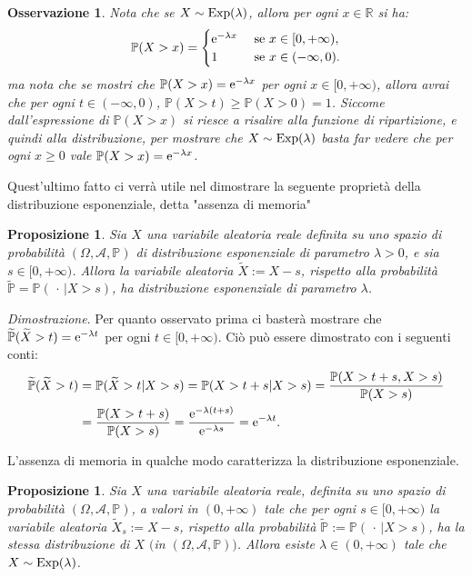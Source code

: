 \documentclass[11pt]{book}
\makeatletter
\theoremstyle{Definizione}
\theoremstyle{TeoremaProposizioneLemmaCorollario}
\newtheorem{mypropo}[myteo]{Proposizione}
\theoremstyle{OsservazioneNota}
\newtheorem{myobs}{Osservazione}[section]
\renewenvironment{proof}[1][\proofname]{\par
  \normalfont \topsep6\p@\@plus6\p@\relax
  \trivlist
  \item[\hskip\labelsep
        \itshape
    #1\@addpunct{.}]\ignorespaces
}{%
  \endtrivlist\@endpefalse
}
\newcommand{\R}{\mathbb{R}}
\renewcommand{\P}{\mathbb{P}}
\newcommand{\e}{\textup{e}}
\renewenvironment{proof}{\textsl{Dimostrazione}.}{}
\makeatother
\begin{document}
\begin{myobs}
Nota che se $X \sim \textup{Exp}(\lambda)$, allora per ogni $x\in \R$ si ha:
$$
\P(X > x) = \begin{cases}
\e^{-\lambda x} &\textup{ se }x\in [0,+\infty),\\
1 & \textup{ se }x \in (-\infty,0).
\end{cases}
$$
ma nota che se mostri che $\P(X > x) = \e^{-\lambda x}$ per ogni $x\in [0,+\infty)$, allora avrai che per ogni $t \in (-\infty,0)$, $\P( X > t) \geq \P (X > 0) = 1$. Siccome dall'espressione di $\P(X > x)$ si riesce a risalire alla funzione di ripartizione, e quindi alla distribuzione, per mostrare che $X\sim \textup{Exp}(\lambda)$ basta far vedere che per ogni $x\geq 0$ vale $\P(X > x) = \e^{-\lambda x}$.
\end{myobs}
Quest'ultimo fatto ci verrà utile nel dimostrare la seguente proprietà della distribuzione esponenziale, detta "assenza di memoria"
\begin{boxpro}
\begin{mypropo}
Sia $X$ una variabile aleatoria reale definita su uno spazio di probabilità $(\Omega,\mathcal{A},\P)$ di distribuzione esponenziale di parametro $\lambda > 0$, e sia $s\in [0,+\infty)$. Allora la variabile aleatoria $\widetilde{X} := X -s$, rispetto alla probabilità $\widetilde{\P} = \P(\,\cdot\,|X > s)$, ha distribuzione esponenziale di parametro $\lambda$.
\end{mypropo}
\tcblower
\begin{proof}
Per quanto osservato prima ci basterà mostrare che $\widetilde{\P}(\widetilde{X} > t) = \e^{-\lambda t}$ per ogni $t \in [0,+\infty)$. Ciò può essere dimostrato con i seguenti conti:
\begin{align*}
\widetilde{\P}(\widetilde{X}> t) &= \P(\widetilde{X}>t|X > s) = \P( X > t+s| X > s) = \frac{\P( X > t+s,X>s)}{\P(X > s)} \\
&= \frac{\P(X > t+s)}{\P(X>s)} = \frac{\e^{-\lambda(t+s)}}{\e^{-\lambda s}}= \e^{-\lambda t}.
\end{align*}
\end{proof}
\end{boxpro}
\noindent
L'assenza di memoria in qualche modo caratterizza la distribuzione esponenziale.
\begin{boxpro}
\begin{mypropo}
Sia $X$ una variabile aleatoria reale, definita su uno spazio di probabilità $(\Omega,\mathcal{A},\P)$, a valori in $(0,+\infty)$ tale che per ogni $s\in [0,+\infty)$ la variabile aleatoria $\widetilde{X}_s:= X - s$, rispetto alla probabilità $\widetilde{\P}:= \P(\,\cdot\,| X > s)$, ha la stessa distribuzione di $X$ $($in $(\Omega,\mathcal{A},\P))$. Allora esiste $\lambda\in (0,+\infty)$ tale che $X \sim \textup{Exp}(\lambda)$.
\end{mypropo}
\end{boxpro}
\end{document}
